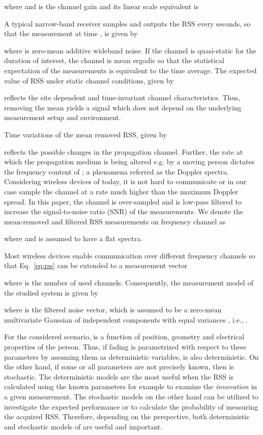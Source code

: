 \documentclass[journal, 10pt, twocolumn, balance]{IEEEtran}
\begin{document}
where  and  is the channel gain and its linear scale equivalent is



A typical narrow-band receiver samples and outputs the RSS every  seconds, so that the measurement at time ,  is given by

where  is zero-mean additive wideband noise. If the channel is quasi-static for the duration of interest, the channel is mean ergodic so that the statistical expectation  of the measurements is equivalent to the time average. The expected value of RSS under static channel conditions, given by

reflects the site dependent and time-invariant channel characteristics. Thus, removing the mean yields a signal which does not depend on the underlying measurement setup and environment. 

Time variations of the mean removed RSS, given by

reflects the possible changes in the propagation channel. Further, the rate at which the propagation medium is being altered e.g. by a moving person dictates the frequency content of ; a phenomena referred as the Doppler spectra. Considering wireless devices of today, it is not hard to communicate or in our case sample the channel at a rate much higher than the maximum Doppler spread. In this paper, the channel is over-sampled and  is low-pass filtered to increase the signal-to-noise ratio (SNR) of the measurements. We denote the mean-removed and filtered RSS measurements on frequency channel  as

where  and  is assumed to have a flat spectra.


Most wireless devices enable communication over different frequency channels  so that Eq.~\eqref{eq:rss} can be extended to a measurement vector 

where  is the number of used channels. Consequently, the measurement model of the studied system is given by

where  is the filtered noise vector, which is assumed to be a zero-mean multivariate Gaussian of independent components with equal variances , i.e., .


For the considered scenario,  is a function of position, geometry and electrical properties of the person. Thus, if fading is parametrized with respect to these parameters by assuming them as deterministic variables,  is also deterministic. On the other hand, if some or all parameters are not precisely known, then  is stochastic. The deterministic models are the most useful when the RSS is calculated using the known parameters for example to examine the \emph{innovation} in a given measurement. The stochastic models on the other hand can be utilized to investigate the expected performance or to calculate the probability of measuring the acquired RSS. Therefore, depending on the perspective, both deterministic and stochastic models of  are useful and important.
\end{document}

